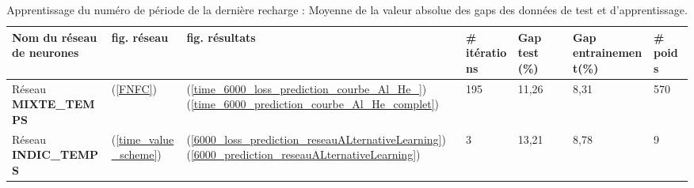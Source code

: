 \begin{table}[H]
	\begin{center}
		\begin{tabular}{|m{4cm}|m{2cm}|m{2.5cm}|m{1.9cm}|m{1.5cm}|m{2cm}|m{1.5cm}|}
			\hline
				\rowcolor{cyan}Nom du réseau de neurones &fig. réseau & fig. résultats&\# itérations& Gap test (\%)&Gap entrainement(\%)& \# poids\\
			\hline
			Réseau \textbf{MIXTE\_TEMPS}&  (\ref{FNFC})& (\ref{time_6000_loss_prediction_courbe_Al_He_}) (\ref{time_6000_prediction_courbe_Al_He_complet}) &195&11,26 & 8,31& 570 \\
			\hline
			Réseau \textbf{INDIC\_TEMPS}&(\ref{time_value_scheme})&(\ref{6000_loss_prediction_reseauALternativeLearning}) (\ref{6000_prediction_reseauALternativeLearning}) &3& 13,21 &8,78 &9 \\
			\hline
		\end{tabular}
	\end{center}
	\caption[Apprentissage du numéro de période de la dernière recharge : Moyenne de la valeur absolue des gaps des données de test et d'apprentissage ]{Apprentissage du numéro de période de la dernière recharge : Moyenne de la valeur absolue des gaps des données de test et d'apprentissage. \label{Gap_time}}
\end{table}

